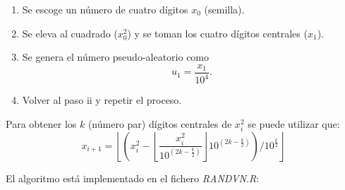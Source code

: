 \documentclass[]{book}
\theoremstyle{definition}
\theoremstyle{definition}
\theoremstyle{definition}
\theoremstyle{remark}
\begin{document}
\begin{enumerate}
\def\labelenumi{\roman{enumi}.}
\item
  Se escoge un número de cuatro dígitos \(x_{0}\) (semilla).
\item
  Se eleva al cuadrado (\(x_{0}^{2}\)) y se toman los cuatro dígitos
  centrales (\(x_{1}\)).
\item
  Se genera el número pseudo-aleatorio
  como\[u_{1}=\frac{x_{1}}{10^{4}}.\]
\item
  Volver al paso ii y repetir el proceso.
\end{enumerate}

Para obtener los \(k\) (número par) dígitos centrales de \(x_{i}^{2}\)
se puede utilizar que:
\[x_{i+1}=\left\lfloor \left(  x_{i}^{2}-\left\lfloor \dfrac{x_{i}^{2}}{10^{(2k-\frac{k}{2})}}\right\rfloor 10^{(2k-\frac{k}{2})}\right)
/10^{\frac{k}{2}}\right\rfloor\]

El algoritmo está implementado en el fichero \emph{RANDVN.R}:
\end{document}

